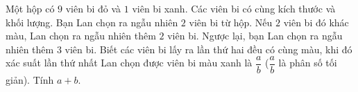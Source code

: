 \begin{ex}
Một hộp có $9$ viên bi đỏ và $1$ viên bi xanh. Các viên bi có cùng kích thước và khối lượng. Bạn Lan chọn ra ngẫu nhiên $2$ viên bi từ hộp. Nếu $2$ viên bi đó khác màu, Lan chọn ra ngẫu nhiên thêm $2$ viên bi. Ngược lại, bạn Lan chọn ra ngẫu nhiên thêm $3$ viên bi. Biết các viên bi lấy ra lần thứ hai đều có cùng màu, khi đó xác suất lần thứ nhất Lan chọn được viên bi màu xanh là $\dfrac ab$ ($\dfrac ab$ là phân số tối giản). Tính $a+b$.
\end{ex}
